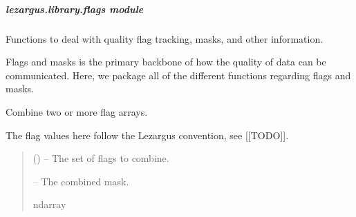 \documentclass[letterpaper,11pt,english]{sphinxmanual}
\begin{document}
\sphinxstepscope


\subparagraph{lezargus.library.flags module}
\label{\detokenize{code/lezargus.library.flags:module-lezargus.library.flags}}\label{\detokenize{code/lezargus.library.flags:lezargus-library-flags-module}}\label{\detokenize{code/lezargus.library.flags::doc}}
\sphinxAtStartPar
Functions to deal with quality flag tracking, masks, and other information.

\sphinxAtStartPar
Flags and masks is the primary backbone of how the quality of data can be
communicated. Here, we package all of the different functions regarding
flags and masks.

\begin{savenotes}\begin{fulllineitems}
\label{\detokenize{code/lezargus.library.flags:lezargus.library.flags.combine_flags}}
\pysigstartsignatures
{}
\pysigstopsignatures
\sphinxAtStartPar
Combine two or more flag arrays.

\sphinxAtStartPar
The flag values here follow the Lezargus convention, see {[}{[}TODO{]}{]}.
\begin{quote}\begin{description}
\sphinxAtStartPar
{} () – The set of flags to combine.

\sphinxAtStartPar
{} – The combined mask.

\sphinxAtStartPar
ndarray

\end{description}\end{quote}

\end{fulllineitems}\end{savenotes}
\end{document}
